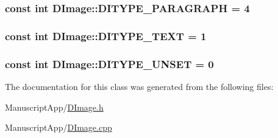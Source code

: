 \hypertarget{class_d_image_a64f62a4c2bfc5b73f14bbb32975353b4}{
\subsubsection[{D\+I\+T\+Y\+P\+E\+\_\+\+P\+A\+R\+A\+G\+R\+A\+P\+H}]{\setlength{\rightskip}{0pt plus 5cm}const int D\+Image\+::\+D\+I\+T\+Y\+P\+E\+\_\+\+P\+A\+R\+A\+G\+R\+A\+P\+H = 4\hspace{0.3cm}{\ttfamily [static]}}}\label{class_d_image_a64f62a4c2bfc5b73f14bbb32975353b4}
\hypertarget{class_d_image_a6a2aac0adab6d13d6efadcd4c29de570}{
\subsubsection[{D\+I\+T\+Y\+P\+E\+\_\+\+T\+E\+X\+T}]{\setlength{\rightskip}{0pt plus 5cm}const int D\+Image\+::\+D\+I\+T\+Y\+P\+E\+\_\+\+T\+E\+X\+T = 1\hspace{0.3cm}{\ttfamily [static]}}}\label{class_d_image_a6a2aac0adab6d13d6efadcd4c29de570}
\hypertarget{class_d_image_abf8ff1b3f61e5a15641bc672eaa9922e}{
\subsubsection[{D\+I\+T\+Y\+P\+E\+\_\+\+U\+N\+S\+E\+T}]{\setlength{\rightskip}{0pt plus 5cm}const int D\+Image\+::\+D\+I\+T\+Y\+P\+E\+\_\+\+U\+N\+S\+E\+T = 0\hspace{0.3cm}{\ttfamily [static]}}}\label{class_d_image_abf8ff1b3f61e5a15641bc672eaa9922e}


The documentation for this class was generated from the following files\+:\begin{DoxyCompactItemize}
\item 
Manuscript\+App/\hyperlink{_d_image_8h}{D\+Image.\+h}\item 
Manuscript\+App/\hyperlink{_d_image_8cpp}{D\+Image.\+cpp}\end{DoxyCompactItemize}
